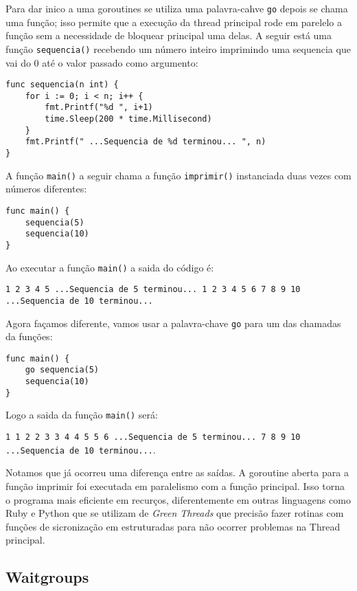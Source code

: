 \documentclass{SBCbookchapter}
\begin{document}
Para dar inico a uma goroutines se utiliza uma palavra-cahve \texttt{go} depois se chama uma função; isso permite que a execução da thread principal rode em parelelo a função sem a necessidade de bloquear principal uma delas.
A seguir está uma função \texttt{sequencia()} recebendo um número inteiro imprimindo uma sequencia que vai do 0 até o valor passado como argumento:

\begin{lstlisting}
func sequencia(n int) {
	for i := 0; i < n; i++ {
		fmt.Printf("%d ", i+1)
		time.Sleep(200 * time.Millisecond)
	}
	fmt.Printf(" ...Sequencia de %d terminou... ", n)
}
\end{lstlisting}

A função \texttt{main()} a seguir chama a função \texttt{imprimir()} instanciada duas vezes com números diferentes:

\begin{lstlisting}
func main() {
	sequencia(5)
	sequencia(10)
}
\end{lstlisting}

Ao executar a função \texttt{main()} a saida do código é:

\noindent\texttt{1 2 3 4 5  ...Sequencia de 5 terminou... 1 2 3 4 5 6 7 8 9 10  ...Sequencia de 10 terminou...}

Agora façamos diferente, vamos usar a palavra-chave \texttt{go} para um das chamadas da funções:

\begin{lstlisting}
func main() {
	go sequencia(5)
	sequencia(10)
}
\end{lstlisting}

Logo a saida da função \texttt{main()} será: 

\noindent\texttt{1 1 2 2 3 3 4 4 5 5 6  ...Sequencia de 5 terminou... 7 8 9 10  ...Sequencia de 10 terminou...}. 

Notamos que já ocorreu uma diferença entre as saídas. A goroutine aberta para a função imprimir foi executada em paralelismo com a função principal. Isso torna o programa mais eficiente em recurços, diferentemente em outras linguagens como Ruby e Python que se utilizam de \textit{Green Threads} que precisão fazer rotinas com funções de sicronização em estruturadas para não ocorrer problemas na Thread principal. 

\subsection{Waitgroups}
\end{document}
